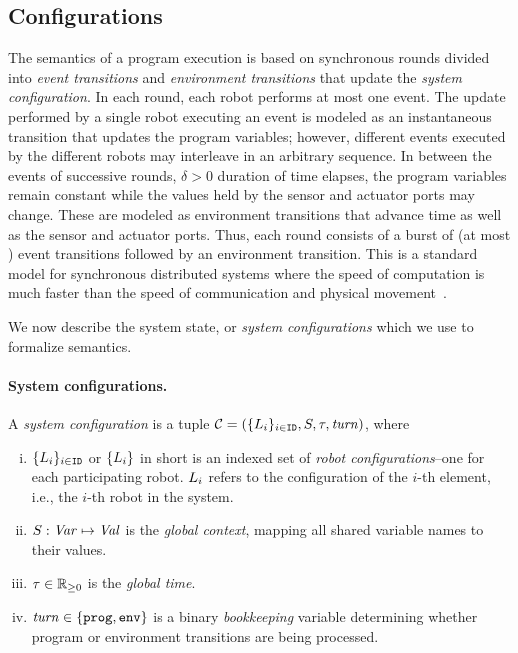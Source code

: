 \subsection{Configurations}
\label{sec:configs}

The semantics of a \lgname program execution is based on synchronous rounds divided into \emph{event transitions} and \emph{environment transitions} that update the \emph{system configuration}.
In each round, each robot performs at most one event.
The update performed by a single robot executing an event is modeled as an instantaneous transition that updates the program variables; however, different events executed by the different robots may interleave in an arbitrary sequence.
In between the events of successive rounds, $\delta>0$ duration of time elapses, the program variables remain constant while the values held by the sensor and actuator ports may change. 
These are modeled as environment transitions that advance time as well as the sensor and actuator ports.
%
Thus, each round consists of a burst of (at most \NMAX) event transitions followed by an environment transition. This is a standard model for synchronous distributed systems where the speed of computation is much faster than the speed of communication and physical movement~\cite{lynch1996a,attiyawelch}. 

We now describe the system state, or \emph{system configurations} which we use to formalize \lgname semantics.

\paragraph{System configurations.}

A \emph{system configuration} is a tuple $\mathcal{C} = (\{L_{i}\}_{i\in\texttt{ID}},{S},\tau,\mathit{turn})$, where

\begin{enumerate}[(i)]
\item $\{L_{i}\}_{i\in\texttt{ID}}$ or $\{L_{i}\}$ in short is an indexed set of \emph{robot configurations}--one for each participating robot.
      $L_{i}$ refers to the configuration of the $i$-th element, i.e., the $i$-th robot in the system.
\item ${S} : \mathit{Var} \mapsto \mathit{Val}$ is the {\em global context\/}, mapping all shared variable names to their values.
\item $\tau\in \nnreals$ is the {\em global time\/}.
\item $\mathit{turn}\in\{\mathtt{prog},\mathtt{env}\}$ is a binary \emph{bookkeeping} variable determining whether program or environment transitions are being processed.
\end{enumerate}

